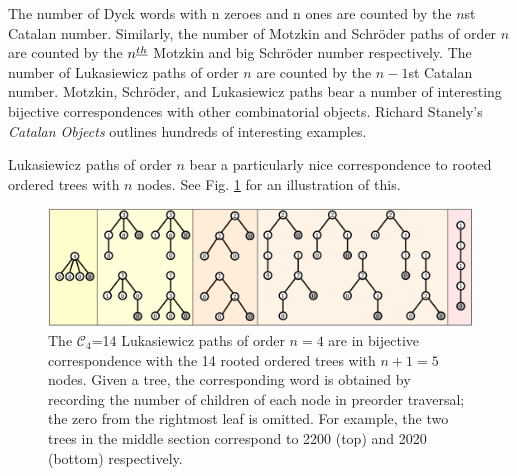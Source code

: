 The number of Dyck words with n zeroes and n ones are counted by the $n$st Catalan number.  Similarly, the number of Motzkin and Schröder paths of order $n$ are counted by the $n^{\underline{th}}$ Motzkin and big Schröder number respectively. The number of Lukasiewicz paths of order $n$ are counted by the $n-1$st Catalan number. %
Motzkin, Schröder, and Lukasiewicz paths bear a number of interesting bijective correspondences with other combinatorial objects. Richard Stanely's \emph{Catalan Objects} outlines hundreds of interesting examples.  

Lukasiewicz paths  of order $n$ bear a particularly nice correspondence to rooted ordered trees with $n$ nodes. See Fig. \ref{trees} for an illustration of this.

\begin{figure}[]
	\centering
	\includegraphics[width = .95 \textwidth]{trees.png}
	\caption{The $\mathcal{C}_4$=14 Lukasiewicz paths of order $n=4$ are in bijective correspondence with the 14 rooted ordered trees with $n+1=5$ nodes.  Given a tree, the corresponding word is obtained by recording the number of children of each node in preorder traversal; the zero from the rightmost leaf is omitted.  For example, the two trees in the middle section correspond to 2200 (top) and 2020 (bottom) respectively.}
	\label{trees}
\end{figure}


